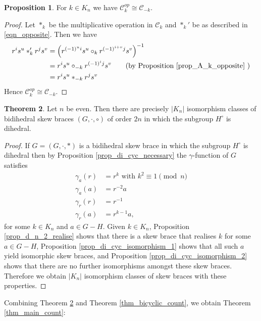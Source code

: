 \documentclass[reqno]{amsart}
\theoremstyle{definition}
\newtheorem{theorem}{Theorem}[section]
\newtheorem{proposition}[theorem]{Proposition}
\begin{document}
\begin{proposition} \label{prop_B_k_opposite}
For $ k \in K_{n} $ we have $ \mathscr{C}_{k}^{op} \cong \mathscr{C}_{-k} $.  
\end{proposition}
\begin{proof}
Let $ \ast_{k} $ be the multiplicative operation in $ \mathscr{C}_{k} $ and 
$ \ast_{k}' $ be as described in \eqref{eqn_opposite}. Then we have
\begin{align*}
r^{i}s^{u} \ast_{k}' r^{j}s^{v} &= \left( r^{(-1)^{u}i}s^{u} \circ_{k}  r^{(-1)^{i+v}j}s^{v} \right)^{-1} \\
&= r^{i}s^{u} \circ_{-k}  r^{(-1)^{i}j}s^{v} \tag{by Proposition \ref{prop_A_k_opposite} } \\
&= r^{i}s^{u} \ast_{-k} r^{j}s^{v}
\end{align*}
Hence $ \mathscr{C}_{k}^{op} \cong \mathscr{C}_{-k} $.
\end{proof}

\begin{theorem} \label{thm_di_cyc_count}
Let $ n $ be even. Then there are precisely $ |K_{n}| $ isomorphism classes of bidihedral skew braces $ (G,\cdot,\circ) $ of order $ 2n $ in which the subgroup $ H^{\circ} $ is dihedral.
\end{theorem}
\begin{proof}
If $ G=(G,\cdot,\ast) $ is a bidihedral skew brace in which the subgroup $ H^{\circ} $ is dihedral then by Proposition \ref{prop_di_cyc_necessary} the $ \gamma $-function of $ G $ satisfies 
\begin{align*}
\gamma_{a}(r) &= r^{k} \mbox{ with } k^{2} \equiv 1 \pmod{n} \\
\gamma_{a}(a) &= r^{-2}a \\
\gamma_{r}(r) &= r^{-1} \\
\gamma_{r}(a) &= r^{k-1}a,
\end{align*}
for some $ k \in K_{n} $ and $ a \in G - H $. Given $ k \in K_{n} $, Proposition \ref{prop_d_n_2_realise} shows that there is a skew brace that realises $ k $ for some $ a \in G - H $, Proposition \ref{prop_di_cyc_isomorphism_1} shows that all such $ a $ yield isomorphic skew braces, and Proposition \ref{prop_di_cyc_isomorphism_2} shows that there are no further isomorphisms amongst these skew braces. Therefore we obtain $ |K_{n}| $ isomorphism classes of skew braces with these properties. 
\end{proof}

Combining Theorem \ref{thm_di_cyc_count} and Theorem \ref{thm_bicyclic_count}, we obtain Theorem \ref{thm_main_count}:
\end{document}

